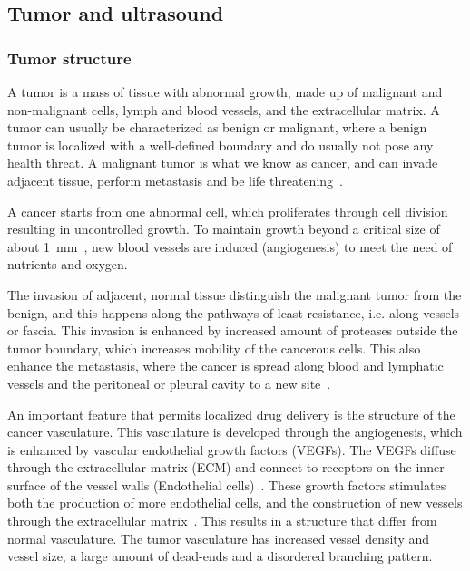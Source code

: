\clearpage
\subsection{Tumor and ultrasound}
\subsubsection{Tumor structure}

 A tumor is a mass of tissue with abnormal growth, made up of malignant and non-malignant cells, lymph and blood vessels, and the extracellular matrix. A tumor can usually be characterized as benign or malignant, where a benign tumor is localized with a well-defined boundary and do usually not pose any health threat. A malignant tumor is what we know as cancer, and can invade adjacent tissue, perform metastasis and be life threatening~\cite{king2006cancer}. 

A cancer starts from one abnormal cell, which proliferates through cell division resulting in uncontrolled growth. To maintain growth beyond a critical size of about \SI{1}{\milli\metre}~\cite{king2006cancer}, new blood vessels are induced (angiogenesis) to meet the need of nutrients and oxygen. 

The invasion of adjacent, normal tissue distinguish the malignant tumor from the benign, and this happens along  the pathways of least resistance, i.e. along vessels or fascia. This invasion is enhanced by increased amount of proteases outside the tumor boundary, which increases mobility of the cancerous cells. This also enhance the metastasis, where the cancer is spread along blood and lymphatic vessels and the peritoneal or pleural cavity to a new site~\cite{king2006cancer}.
 
An important feature that permits localized drug delivery is the structure of the cancer vasculature. This vasculature is developed through the angiogenesis, which is enhanced by vascular endothelial growth factors (VEGFs). The VEGFs diffuse through the extracellular matrix (ECM) and connect to receptors on the inner surface of the vessel walls (Endothelial cells)~\cite{Koumoutsakos2013}. These growth factors stimulates both the production of more endothelial cells, and the construction of new vessels through the extracellular matrix~\cite{Nishida2006}. This results in a structure that differ from normal vasculature. The tumor vasculature has increased vessel density and vessel size, a large amount of dead-ends and a disordered branching pattern.    


